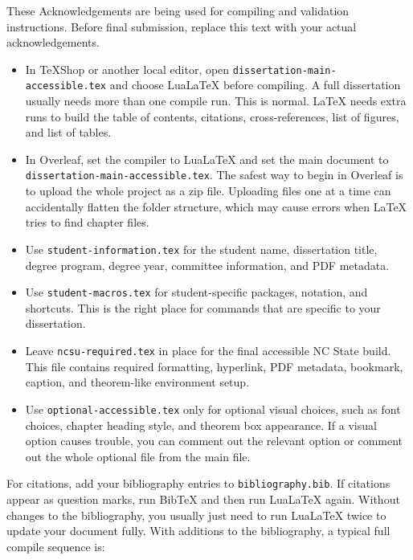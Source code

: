 \begin{acknowledgements}

These Acknowledgements are being used for compiling and validation instructions. Before final submission, replace this text with your actual acknowledgements.

\begin{itemize}

\item In TeXShop or another local editor, open \texttt{dissertation-main-accessible.tex} and choose LuaLaTeX before compiling. A full dissertation usually needs more than one compile run. This is normal. LaTeX needs extra runs to build the table of contents, citations, cross-references, list of figures, and list of tables.

\item In Overleaf, set the compiler to LuaLaTeX and set the main document to \texttt{dissertation-main-accessible.tex}. The safest way to begin in Overleaf is to upload the whole project as a zip file. Uploading files one at a time can accidentally flatten the folder structure, which may cause errors when LaTeX tries to find chapter files.

\item Use \texttt{student-information.tex} for the student name, dissertation title, degree program, degree year, committee information, and PDF metadata.

\item Use \texttt{student-macros.tex} for student-specific packages, notation, and shortcuts. This is the right place for commands that are specific to your dissertation.

\item Leave \texttt{ncsu-required.tex} in place for the final accessible NC State build. This file contains required formatting, hyperlink, PDF metadata, bookmark, caption, and theorem-like environment setup.

\item Use \texttt{optional-accessible.tex} only for optional visual choices, such as font choices, chapter heading style, and theorem box appearance. If a visual option causes trouble, you can comment out the relevant option or comment out the whole optional file from the main file.

\end{itemize}

For citations, add your bibliography entries to \texttt{bibliography.bib}. If citations appear as question marks, run BibTeX and then run LuaLaTeX again. Without changes to the bibliography, you usually just need to run LuaLaTeX twice to update your document fully. With additions to the bibliography, a typical full compile sequence is:


\end{acknowledgements}
